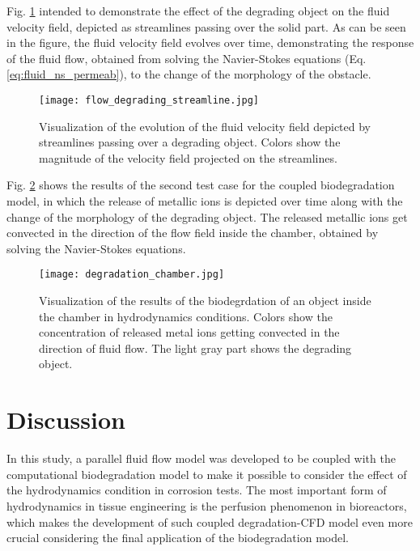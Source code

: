 Fig. \ref{fig:fluid_flow_degrading_streamline} intended to demonstrate the effect of the degrading object on the fluid velocity field, depicted as streamlines passing over the solid part. As can be seen in the figure, the fluid velocity field evolves over time, demonstrating the response of the fluid flow, obtained from solving the Navier-Stokes equations (Eq. \ref{eq:fluid_ns_permeab}), to the change of the morphology of the obstacle.


\begin{figure}[h]
\centering
\medskip
\texttt{[image: flow\_degrading\_streamline.jpg]}
\caption[Fluid flow streamlines in the presence of a degrading object]{Visualization of the evolution of the fluid velocity field depicted by streamlines passing over a degrading object. Colors show the magnitude of the velocity field projected on the streamlines.} \label{fig:fluid_flow_degrading_streamline}
\end{figure}


Fig. \ref{fig:fluid_degradation_chamber} shows the results of the second test case for the coupled biodegradation model, in which the release of metallic ions is depicted over time along with the change of the morphology of the degrading object. The released metallic ions get convected in the direction of the flow field inside the chamber, obtained by solving the Navier-Stokes equations.


\begin{figure}[h]
\centering
\medskip
\texttt{[image: degradation\_chamber.jpg]}
\caption[Visualization of the biodegradation inside the chamber in presence of fluid flow]{Visualization of the results of the biodegrdation of an object inside the chamber in hydrodynamics conditions. Colors show the concentration of released metal ions getting convected in the direction of fluid flow. The light gray part shows the degrading object.} \label{fig:fluid_degradation_chamber}
\end{figure}


\section{Discussion}


In this study, a parallel fluid flow model was developed to be coupled with the computational biodegradation model to make it possible to consider the effect of the hydrodynamics condition in corrosion tests. The most important form of hydrodynamics in tissue engineering is the perfusion phenomenon in bioreactors, which makes the development of such coupled degradation-CFD model even more crucial considering the final application of the biodegradation model.


